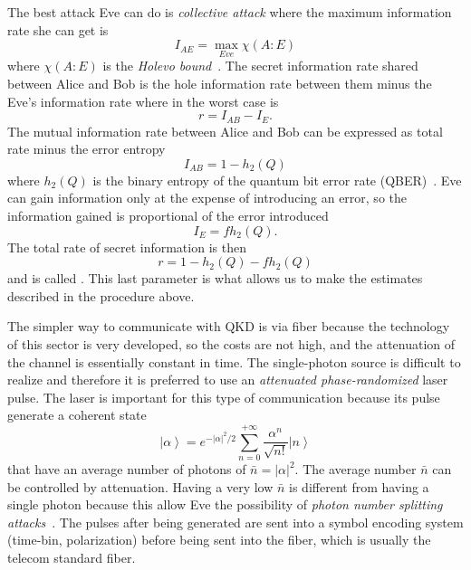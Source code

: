 The best attack Eve can do is \textit{collective attack} where the maximum information rate she can get is
\begin{equation}
  I_{AE} = \max_{Eve} \chi(A:E)
\end{equation}
where $\chi(A:E)$ is the \textit{Holevo bound}~\cite{a24}. The secret information rate shared between Alice and Bob is the hole information rate between them minus the Eve's information rate where in the worst case is
\begin{equation}
  r = I_{AB} - I_{E}.
\end{equation}
The mutual information rate between Alice and Bob can be expressed as total rate minus the error entropy
\begin{equation}
  I_{AB} = 1 - h_2(Q)
\end{equation}
where $h_2(Q)$ is the binary entropy of the quantum bit error rate (QBER)~\cite{a24}. Eve can gain information only at the expense of introducing an error, so the information gained is proportional of the error introduced
\begin{equation}
  I_E = f h_2(Q).
\end{equation}
The total rate of secret information is then
\begin{equation}
  r = 1 - h_2(Q) - f h_2(Q)
\end{equation}
and is called . This last parameter is what allows us to make the estimates described in the procedure above.


The simpler way to communicate with QKD is via fiber because the technology of this sector is very developed, so the costs are not high, and the attenuation of the channel is essentially constant in time. The single-photon source is difficult to realize and therefore it is preferred to use an \textit{attenuated phase-randomized} laser pulse. The laser is important for this type of communication because its pulse generate a coherent state
\begin{equation}
  \left|\alpha\right> = e^{- |\alpha|^2 / 2} \sum_{n=0}^{+\infty} \frac{\alpha^n}{\sqrt{n!}} \left|n\right>
\end{equation}
that have an average number of photons of $\bar{n} = |\alpha|^2$. The average number $\bar{n}$ can be controlled by attenuation. Having a very low $\bar{n}$ is different from having a single photon because this allow Eve the possibility of \textit{photon number splitting attacks}~\cite{a24}. The pulses after being generated are sent into a symbol encoding system (time-bin, polarization) before being sent into the fiber, which is usually the telecom standard fiber.


